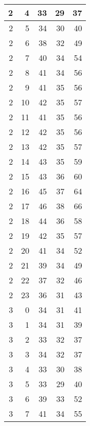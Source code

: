 \begin{longtable}{|r|r|r|r|r|}
    \hline
    2     & 4     & 33    & 29    & 37 \\
    \hline
    2     & 5     & 34    & 30    & 40 \\
    \hline
    2     & 6     & 38    & 32    & 49 \\
    \hline
    2     & 7     & 40    & 34    & 54 \\
    \hline
    2     & 8     & 41    & 34    & 56 \\
    \hline
    2     & 9     & 41    & 35    & 56 \\
    \hline
    2     & 10    & 42    & 35    & 57 \\
    \hline
    2     & 11    & 41    & 35    & 56 \\
    \hline
    2     & 12    & 42    & 35    & 56 \\
    \hline
    2     & 13    & 42    & 35    & 57 \\
    \hline
    2     & 14    & 43    & 35    & 59 \\
    \hline
    2     & 15    & 43    & 36    & 60 \\
    \hline
    2     & 16    & 45    & 37    & 64 \\
    \hline
    2     & 17    & 46    & 38    & 66 \\
    \hline
    2     & 18    & 44    & 36    & 58 \\
    \hline
    2     & 19    & 42    & 35    & 57 \\
    \hline
    2     & 20    & 41    & 34    & 52 \\
    \hline
    2     & 21    & 39    & 34    & 49 \\
    \hline
    2     & 22    & 37    & 32    & 46 \\
    \hline
    2     & 23    & 36    & 31    & 43 \\
    \hline
    3     & 0     & 34    & 31    & 41 \\
    \hline
    3     & 1     & 34    & 31    & 39 \\
    \hline
    3     & 2     & 33    & 32    & 37 \\
    \hline
    3     & 3     & 34    & 32    & 37 \\
    \hline
    3     & 4     & 33    & 30    & 38 \\
    \hline
    3     & 5     & 33    & 29    & 40 \\
    \hline
    3     & 6     & 39    & 33    & 52 \\
    \hline
    3     & 7     & 41    & 34    & 55 \\

\end{longtable}
